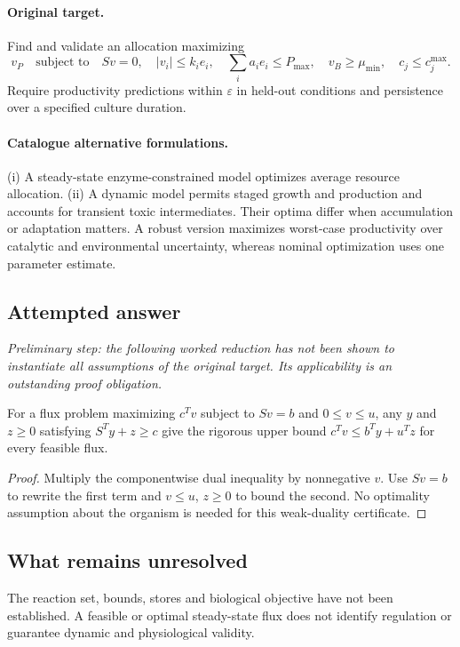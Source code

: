 \documentclass[11pt]{article}
\begin{document}
\paragraph{Original target.}
Find and validate an allocation maximizing
\[
 v_P\quad\text{subject to}\quad Sv=0,\quad
 |v_i|\leq k_ie_i,\quad\sum_i a_ie_i\leq P_{\max},
 \quad v_B\geq\mu_{\min},\quad c_j\leq c_j^{\max}.
\]
Require productivity predictions within $\varepsilon$ in held-out conditions and persistence over a specified culture duration.
\paragraph{Catalogue alternative formulations.}
(i) A steady-state enzyme-constrained model optimizes average resource allocation. (ii) A dynamic model permits staged growth and production and accounts for transient toxic intermediates. Their optima differ when accumulation or adaptation matters. A robust version maximizes worst-case productivity over catalytic and environmental uncertainty, whereas nominal optimization uses one parameter estimate.
\subsection{Attempted answer}
\noindent\emph{Preliminary step: the following worked reduction has not been shown to instantiate all assumptions of the original target. Its applicability is an outstanding proof obligation.}

\begin{proposition}
For a flux problem maximizing $c^Tv$ subject to $Sv=b$ and $0\leq v\leq u$, any $y$ and $z\geq0$ satisfying $S^Ty+z\geq c$ give the rigorous upper bound $c^Tv\leq b^Ty+u^Tz$ for every feasible flux.
\end{proposition}
\begin{proof}
Multiply the componentwise dual inequality by nonnegative $v$. Use $Sv=b$ to rewrite the first term and $v\leq u$, $z\geq0$ to bound the second. No optimality assumption about the organism is needed for this weak-duality certificate.
\end{proof}
\subsection{What remains unresolved}
The reaction set, bounds, stores and biological objective have not been established. A feasible or optimal steady-state flux does not identify regulation or guarantee dynamic and physiological validity.
\end{document}
